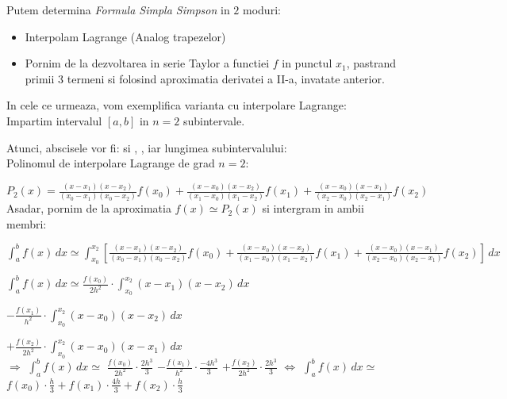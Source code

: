 \documentclass{article}
\begin{document}
Putem determina \textit{Formula Simpla Simpson} in $2$ moduri:
\begin{itemize}
    \item Interpolam Lagrange (Analog trapezelor)
    \item Pornim de la dezvoltarea in serie Taylor a functiei $f$ in punctul $x_1$, pastrand primii $3$ termeni si folosind aproximatia derivatei a II-a, invatate anterior.
\end{itemize}

In cele ce urmeaza, vom exemplifica varianta cu interpolare Lagrange: \\


Impartim intervalul $[a,b]$ in $n=2$ subintervale.

Atunci, abscisele vor fi:  si , , iar lungimea subintervalului:  \\

Polinomul de interpolare Lagrange de grad $n=2$:

$P_2(x) = \frac{(x-x_1)(x-x_2)}{(x_0-x_1)(x_0-x_2)}f(x_0) + \frac{(x-x_0)(x-x_2)}{(x_1-x_0)(x_1-x_2)}f(x_1) + \frac{(x-x_0)(x-x_1)}{(x_2-x_0)(x_2-x_1)}f(x_2)$ \\

Asadar, pornim de la aproximatia $f(x) \simeq P_2(x)$ si intergram in ambii membri:

$\int_a^b f(x)\, dx \simeq \int_{x_0}^{x_2} [\frac{(x-x_1)(x-x_2)}{(x_0-x_1)(x_0-x_2)}f(x_0) + \frac{(x-x_0)(x-x_2)}{(x_1-x_0)(x_1-x_2)}f(x_1) + \frac{(x-x_0)(x-x_1)}{(x_2-x_0)(x_2-x_1)}f(x_2)]\, dx$ \newpage

$\int_a^b f(x)\, dx \simeq 
\frac{f(x_0)}{2h^2} \cdot \int_{x_0}^{x_2} (x-x_1)(x-x_2)\, dx$

\hspace{1.75cm}$- \frac{f(x_1)}{h^2} \cdot \int_{x_0}^{x_2} (x-x_0)(x-x_2)\, dx$ 

\hspace{1.75cm}$+ \frac{f(x_2)}{2h^2} \cdot \int_{x_0}^{x_2} (x-x_0)(x-x_1)\, dx$ \\

\hspace{-0.5cm}$\Rightarrow$
$\int_a^b f(x)\, dx \simeq$
$\frac{f(x_0)}{2h^2} \cdot \frac{2h^3}{3}$
$- \frac{f(x_1)}{h^2} \cdot \frac{-4h^3}{3}$
$+ \frac{f(x_2)}{2h^2} \cdot \frac{2h^3}{3}$
$\iff$
$\int_a^b f(x)\, dx \simeq$
$f(x_0) \cdot \frac{h}{3} + f(x_1) \cdot \frac{4h}{3} + f(x_2) \cdot \frac{h}{3}$ \\
\end{document}
